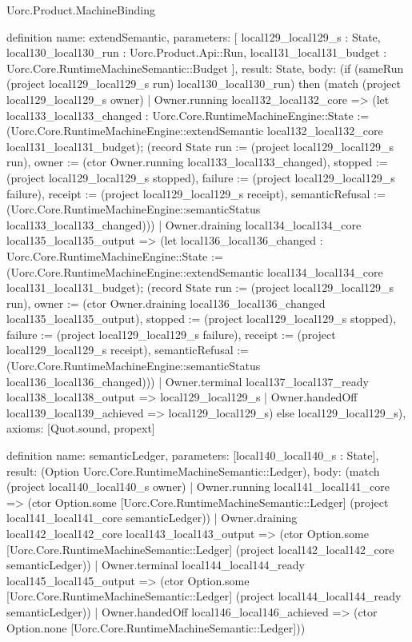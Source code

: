 \begin{lexlean}{Uorc.Product.MachineBinding}
\begin{semanticmodule}
definition{
  name: extendSemantic,
  parameters: [
    local129_local129_s : State,
    local130_local130_run : Uorc.Product.Api::Run,
    local131_local131_budget : Uorc.Core.RuntimeMachineSemantic::Budget
  ],
  result: State,
  body: (if (sameRun (project local129_local129_s run) local130_local130_run) then (match (project local129_local129_s owner)
    | Owner.running local132_local132_core => (let local133_local133_changed : Uorc.Core.RuntimeMachineEngine::State := (Uorc.Core.RuntimeMachineEngine::extendSemantic local132_local132_core local131_local131_budget); (record State {run := (project local129_local129_s run), owner := (ctor Owner.running local133_local133_changed), stopped := (project local129_local129_s stopped), failure := (project local129_local129_s failure), receipt := (project local129_local129_s receipt), semanticRefusal := (Uorc.Core.RuntimeMachineEngine::semanticStatus local133_local133_changed)}))
    | Owner.draining local134_local134_core local135_local135_output => (let local136_local136_changed : Uorc.Core.RuntimeMachineEngine::State := (Uorc.Core.RuntimeMachineEngine::extendSemantic local134_local134_core local131_local131_budget); (record State {run := (project local129_local129_s run), owner := (ctor Owner.draining local136_local136_changed local135_local135_output), stopped := (project local129_local129_s stopped), failure := (project local129_local129_s failure), receipt := (project local129_local129_s receipt), semanticRefusal := (Uorc.Core.RuntimeMachineEngine::semanticStatus local136_local136_changed)}))
    | Owner.terminal local137_local137_ready local138_local138_output => local129_local129_s
    | Owner.handedOff local139_local139_achieved => local129_local129_s) else local129_local129_s),
  axioms: [Quot.sound, propext]
}

definition{
  name: semanticLedger,
  parameters: [local140_local140_s : State],
  result: (Option Uorc.Core.RuntimeMachineSemantic::Ledger),
  body: (match (project local140_local140_s owner)
    | Owner.running local141_local141_core => (ctor Option.some [Uorc.Core.RuntimeMachineSemantic::Ledger] (project local141_local141_core semanticLedger))
    | Owner.draining local142_local142_core local143_local143_output => (ctor Option.some [Uorc.Core.RuntimeMachineSemantic::Ledger] (project local142_local142_core semanticLedger))
    | Owner.terminal local144_local144_ready local145_local145_output => (ctor Option.some [Uorc.Core.RuntimeMachineSemantic::Ledger] (project local144_local144_ready semanticLedger))
    | Owner.handedOff local146_local146_achieved => (ctor Option.none [Uorc.Core.RuntimeMachineSemantic::Ledger]))
}


\end{semanticmodule}
\end{lexlean}
